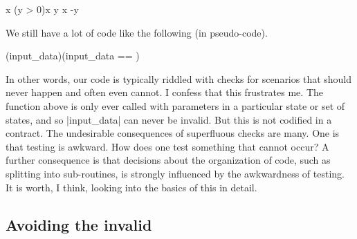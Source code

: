 \documentclass[10pt]{amsart}
\begin{document}
\begin{codex}
\begin{offsideBlue}
\begin{PVerbatim}
  \ckw[block]\cop[:]                                
     \ckw[int] x 
     \cellipsis[]
     \ckw[if] (y > 0)\cop[:]
        x \cop[:=] y
     \cdedent \ckw[else]
        x \cop[:=] -y
     \cend
  \cend
\end{PVerbatim}
\end{offsideBlue}
\end{codex}

We still have a lot of code like the following (in pseudo-code).
\begin{offsideBlue}
\begin{PVerbatim}
  \ckw[function](\ctype[*inputStructure] input_data)\cop[:]
     \ckw[if] (input_data == \clab[null])\cop[:]
                
     \cend
  \cend
\end{PVerbatim}
\end{offsideBlue}
In other words, our code is typically riddled with checks for
scenarios that should never happen and often even cannot.  I confess
that this frustrates me.  The function above is only ever called with
parameters in a particular state or set of states, and so |input_data|
can never be invalid.  But this is not codified in a contract.  The
undesirable consequences of superfluous checks are many.  One is that
testing is awkward.  How does one test something that cannot occur?  A
further consequence is that decisions about the organization of code,
such as splitting into sub-routines, is strongly influenced by the
awkwardness of testing.  It is worth, I think, looking into the basics
of this in detail.

\subsection{Avoiding the invalid}
\end{document}
